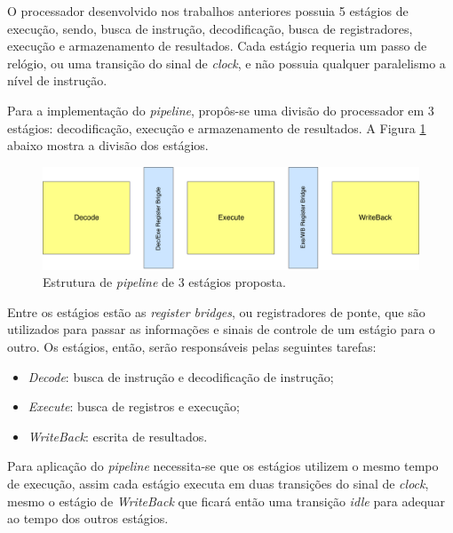 \documentclass[11pt,a4paper,titlepage]{article}
\begin{document}
O processador desenvolvido nos trabalhos anteriores possuia 5 estágios de execução, sendo, busca de instrução, decodificação, busca de registradores, execução e armazenamento de resultados. Cada estágio requeria um passo de relógio, ou uma transição do sinal de \textit{clock}, e não possuia qualquer paralelismo a nível de instrução.

Para a implementação do \textit{pipeline}, propôs-se uma divisão do processador em 3 estágios: decodificação, execução e armazenamento de resultados. A Figura \ref{fig:pipeline3stage} abaixo mostra a divisão dos estágios.

\begin{figure}[!h]
\centering
\includegraphics[scale=0.4]{images/pipeline.pdf}
\caption{Estrutura de \textit{pipeline} de 3 estágios proposta.}
\label{fig:pipeline3stage}
\end{figure}

Entre os estágios estão as \textit{register bridges}, ou registradores de ponte, que são utilizados para passar as informações e sinais de controle de um estágio para o outro. Os estágios, então, serão responsáveis pelas seguintes tarefas:

\begin{itemize}

\item \textit{Decode}: busca de instrução e decodificação de instrução;

\item \textit{Execute}: busca de registros e execução;

\item \textit{WriteBack}: escrita de resultados.

\end{itemize}

Para aplicação do \textit{pipeline} necessita-se que os estágios utilizem o mesmo tempo de execução, assim cada estágio executa em duas transições do sinal de \textit{clock}, mesmo o estágio de \textit{WriteBack} que ficará então uma transição \textit{idle} para adequar ao tempo dos outros estágios.
\end{document}
